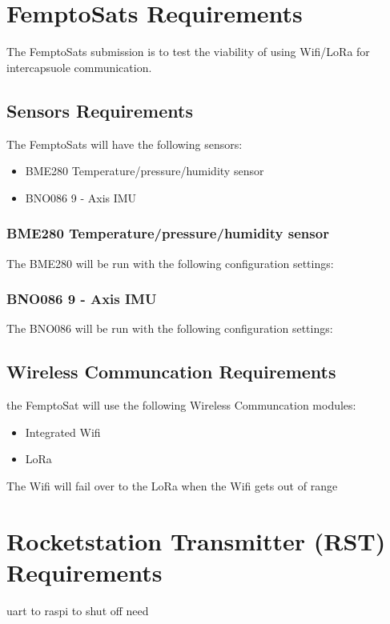 \documentclass{book}
\begin{document}
\section{FemptoSats Requirements}
\par The FemptoSats submission is to test the viability of using Wifi/LoRa for intercapsuole communication. 

\subsection{Sensors Requirements}
\par The FemptoSats will have the following sensors: 
\begin{itemize}
    \item BME280 Temperature/pressure/humidity sensor
    \item BNO086 9 - Axis IMU
\end{itemize}

\subsubsection{BME280 Temperature/pressure/humidity sensor}
\par The BME280 will be run with the following configuration settings: 

\subsubsection{BNO086 9 - Axis IMU}
\par The BNO086 will be run with the following configuration settings:

\subsection{Wireless Communcation Requirements}
\par the FemptoSat will use the following Wireless Communcation modules:
\begin{itemize}
    \item Integrated Wifi
    \item LoRa
\end{itemize}
\par The Wifi will fail over to the LoRa when the Wifi gets out of range

\section{Rocketstation Transmitter (RST) Requirements}
\par uart to raspi to shut off need
\end{document}
